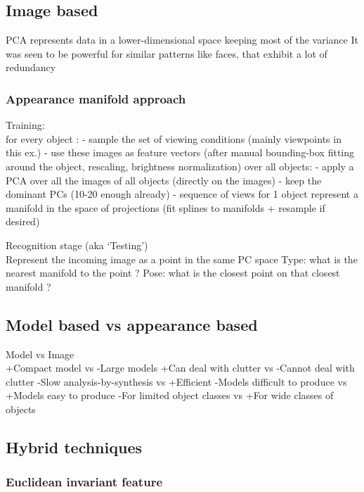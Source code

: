\subsection{Image based}
PCA represents data in a lower-dimensional space keeping most of the variance
It was seen to be powerful for similar patterns like faces, that exhibit a lot of redundancy

\subsubsection{Appearance manifold approach}
Training:\\
for every object : - sample the set of viewing conditions (mainly viewpoints in this ex.)
- use these images as feature vectors (after manual bounding-box fitting around the object, rescaling, brightness normalization)
over all objects: - apply a PCA over all the images of all objects (directly on the images)
- keep the dominant PCs (10-20 enough already)
- sequence of views for 1 object represent a manifold in the space of projections (fit splines to manifolds + resample if desired)

Recognition stage (aka `Testing’)\\

Represent the incoming image as a point in the same PC space
Type: what is the nearest manifold to the point ?
Pose: what is the closest point on that closest manifold ?

\subsection{Model based vs appearance based}
Model vs Image\\

+Compact model vs -Large models
+Can deal with clutter vs -Cannot deal with clutter
-Slow analysis-by-synthesis vs +Efficient
-Models difficult to produce vs +Models easy to produce
-For limited object classes vs +For wide classes of objects

\subsection{Hybrid techniques}
\subsubsection{Euclidean invariant feature}

